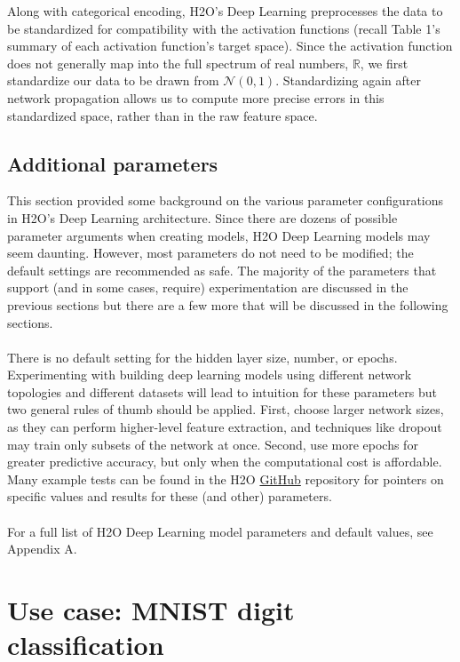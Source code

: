 Along with categorical encoding, H2O's Deep Learning preprocesses the data to be standardized for compatibility with the activation functions (recall Table 1's summary of each activation function's target space). Since the activation function does not generally map into the full spectrum of real numbers, $\mathbb{R}$, we first standardize our data to be drawn from $\mathcal{N}(0,1)$. Standardizing again after network propagation allows us to compute more precise errors in this standardized space, rather than in the raw feature space. 

\subsection{Additional parameters} 

This section provided some background on the various parameter configurations in H2O's Deep Learning architecture. Since there are dozens of possible parameter arguments when creating models, H2O Deep Learning models may seem daunting. However, most parameters do not need to be modified; the default settings are recommended as safe. The majority of the parameters that support (and in some cases, require) experimentation are discussed in the previous sections but there are a few more that will be discussed in the following sections. 
\\
\\
There is no default setting for the hidden layer size, number, or epochs. Experimenting with building deep learning models using different network topologies and different datasets will lead to intuition for these parameters but two general rules of thumb should be applied. First, choose larger network sizes, as they can perform higher-level feature extraction, and techniques like dropout may train only subsets of the network at once. Second, use more epochs for greater predictive accuracy, but only when the computational cost is affordable. Many example tests can be found in the H2O \href{https://github.com/h2oai/h2o-3/}{GitHub} repository for pointers on specific values and results for these (and other) parameters.
\\
\\
For a full list of H2O Deep Learning model parameters and default values, see Appendix A.   %

\section{Use case: MNIST digit classification} 


